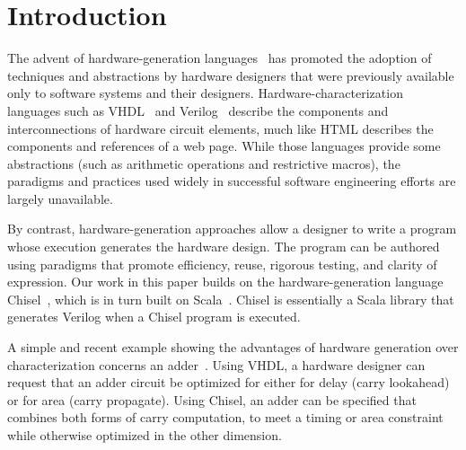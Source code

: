 \documentclass[sigplan,anonymous,review]{acmart}
\begin{document}

\maketitle

\section{Introduction}

The advent of hardware-generation languages~\cite{chisel:article} has promoted the adoption of techniques and abstractions by hardware designers that were previously available only to software systems and their designers. Hardware-characterization languages such as VHDL~\cite{vhdl} and Verilog~\cite{verilog} describe the components and interconnections of hardware circuit elements, much like HTML describes the components and references of a web page. While those languages provide some abstractions (such as arithmetic operations and restrictive macros), the paradigms and practices used widely in successful software engineering efforts are largely unavailable.

By contrast, hardware-generation approaches allow a designer to write a program whose execution generates the hardware design. The program can be authored using paradigms that promote efficiency, reuse, rigorous testing, and clarity of expression. Our work in this paper builds on the hardware-generation language Chisel~\cite{chisel:book}, which is in turn built on Scala~\cite{scala-overview-tech-report}. Chisel is essentially a Scala library that generates Verilog when a Chisel program is executed.

A simple and recent example showing the advantages of hardware generation over characterization concerns an adder~\cite{Deters:adder}. Using VHDL, a hardware designer can request that an adder circuit be optimized for either for delay (carry lookahead) or for area (carry propagate). Using Chisel, an adder can be specified that combines both forms of carry computation, to meet a timing or area constraint while otherwise optimized in the other dimension.
\end{document}
